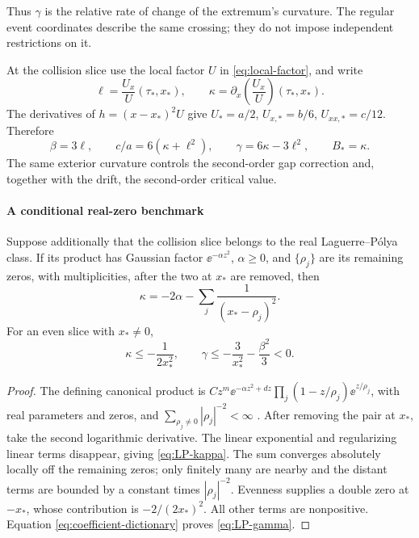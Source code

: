Thus \(\gamma\) is the relative rate of change of the extremum's
curvature. The regular event coordinates describe the same crossing;
they do not impose independent restrictions on it.

At the collision slice use the local factor \(U\) in
\eqref{eq:local-factor}, and write
\begin{equation}\label{eq:ell-kappa}
 \ell=\frac{U_x}{U}(\tau_*,x_*),\qquad
 \kappa=\partial_x\!\left(\frac{U_x}{U}\right)(\tau_*,x_*).
\end{equation}
The derivatives of \(h=(x-x_*)^2U\) give
\(U_*=a/2\), \(U_{x,*}=b/6\), \(U_{xx,*}=c/12\). Therefore
\begin{equation}\label{eq:coefficient-dictionary}
 \boxed{\ \beta=3\ell,\qquad c/a=6(\kappa+\ell^2),\qquad
 \gamma=6\kappa-3\ell^2,\qquad B_*=\kappa.\ }
\end{equation}
The same exterior curvature controls the second-order gap correction
and, together with the drift, the second-order critical value.

\paragraph{A conditional real-zero benchmark}
\begin{proposition}
\label{prop:LP-coefficients}
Suppose additionally that the collision slice belongs to the real
Laguerre--P\'olya class. If its product has Gaussian factor
\(\ee^{-\alpha z^2}\), \(\alpha\ge0\), and \(\{\rho_j\}\)
are its remaining zeros, with multiplicities, after the two at \(x_*\)
are removed, then
\begin{equation}\label{eq:LP-kappa}
 \kappa=-2\alpha-\sum_j\frac{1}{(x_*-\rho_j)^2}.
\end{equation}
For an even slice with \(x_*\ne0\),
\begin{equation}\label{eq:LP-gamma}
 \kappa\le-\frac{1}{2x_*^2},\qquad
 \gamma\le-\frac{3}{x_*^2}-\frac{\beta^2}{3}<0.
\end{equation}
\end{proposition}
\begin{proof}
The defining canonical product is
\(Cz^m\ee^{-\alpha z^2+d z}
\prod_j(1-z/\rho_j)\ee^{z/\rho_j}\), with real parameters and zeros,
and \(\sum_{\rho_j\ne0}|\rho_j|^{-2}<\infty\)
\cite[Definition~1.1]{Csordas2014PositiveKernels}.
After removing the pair at \(x_*\), take the second logarithmic
derivative. The linear exponential and regularizing linear terms
disappear, giving \eqref{eq:LP-kappa}. The sum converges absolutely
locally off the remaining zeros; only finitely many are nearby and
the distant terms are bounded by a constant times \(|\rho_j|^{-2}\).
Evenness supplies a double zero at \(-x_*\), whose contribution is
\(-2/(2x_*)^2\). All other terms are nonpositive. Equation
\eqref{eq:coefficient-dictionary} proves \eqref{eq:LP-gamma}.
\end{proof}

